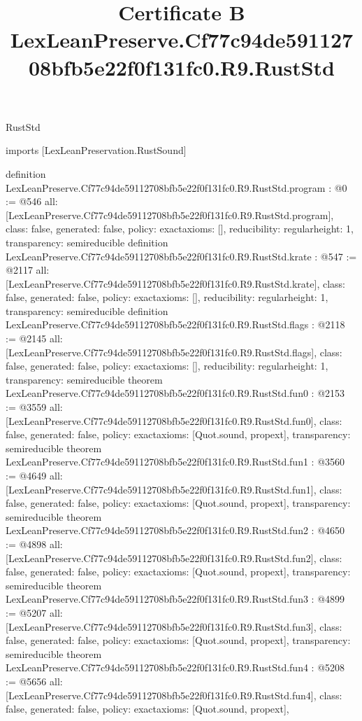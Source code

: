 \begin{lexlean}{RustStd}
\title{Certificate B LexLeanPreserve.Cf77c94de59112708bfb5e22f0f131fc0.R9.RustStd}
\begin{coremodule}
imports [LexLeanPreservation.RustSound]

definition LexLeanPreserve.Cf77c94de59112708bfb5e22f0f131fc0.R9.RustStd.program : @0 := @546 {
  all: [LexLeanPreserve.Cf77c94de59112708bfb5e22f0f131fc0.R9.RustStd.program],
  class: false,
  generated: false,
  policy: exact{axioms: []},
  reducibility: regular{height: 1},
  transparency: semireducible
}
definition LexLeanPreserve.Cf77c94de59112708bfb5e22f0f131fc0.R9.RustStd.krate : @547 := @2117 {
  all: [LexLeanPreserve.Cf77c94de59112708bfb5e22f0f131fc0.R9.RustStd.krate],
  class: false,
  generated: false,
  policy: exact{axioms: []},
  reducibility: regular{height: 1},
  transparency: semireducible
}
definition LexLeanPreserve.Cf77c94de59112708bfb5e22f0f131fc0.R9.RustStd.flags : @2118 := @2145 {
  all: [LexLeanPreserve.Cf77c94de59112708bfb5e22f0f131fc0.R9.RustStd.flags],
  class: false,
  generated: false,
  policy: exact{axioms: []},
  reducibility: regular{height: 1},
  transparency: semireducible
}
theorem LexLeanPreserve.Cf77c94de59112708bfb5e22f0f131fc0.R9.RustStd.fun0 : @2153 := @3559 {
  all: [LexLeanPreserve.Cf77c94de59112708bfb5e22f0f131fc0.R9.RustStd.fun0],
  class: false,
  generated: false,
  policy: exact{axioms: [Quot.sound, propext]},
  transparency: semireducible
}
theorem LexLeanPreserve.Cf77c94de59112708bfb5e22f0f131fc0.R9.RustStd.fun1 : @3560 := @4649 {
  all: [LexLeanPreserve.Cf77c94de59112708bfb5e22f0f131fc0.R9.RustStd.fun1],
  class: false,
  generated: false,
  policy: exact{axioms: [Quot.sound, propext]},
  transparency: semireducible
}
theorem LexLeanPreserve.Cf77c94de59112708bfb5e22f0f131fc0.R9.RustStd.fun2 : @4650 := @4898 {
  all: [LexLeanPreserve.Cf77c94de59112708bfb5e22f0f131fc0.R9.RustStd.fun2],
  class: false,
  generated: false,
  policy: exact{axioms: [Quot.sound, propext]},
  transparency: semireducible
}
theorem LexLeanPreserve.Cf77c94de59112708bfb5e22f0f131fc0.R9.RustStd.fun3 : @4899 := @5207 {
  all: [LexLeanPreserve.Cf77c94de59112708bfb5e22f0f131fc0.R9.RustStd.fun3],
  class: false,
  generated: false,
  policy: exact{axioms: [Quot.sound, propext]},
  transparency: semireducible
}
theorem LexLeanPreserve.Cf77c94de59112708bfb5e22f0f131fc0.R9.RustStd.fun4 : @5208 := @5656 {
  all: [LexLeanPreserve.Cf77c94de59112708bfb5e22f0f131fc0.R9.RustStd.fun4],
  class: false,
  generated: false,
  policy: exact{axioms: [Quot.sound, propext]},
}
\end{coremodule}
\end{lexlean}
